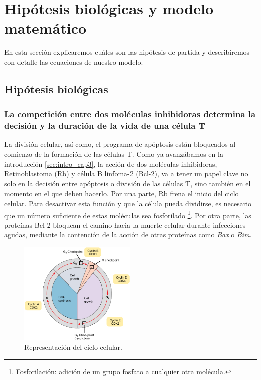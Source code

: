 \section{Hipótesis biológicas y modelo matemático}

En esta sección explicaremos cuáles son las hipótesis de partida y describiremos con detalle las ecuaciones de nuestro modelo. 

\subsection{Hipótesis biológicas} 
\label{subsec:hip_bio}

\subsubsection{La competición entre dos moléculas inhibidoras determina la decisión y la duración de la vida de una célula T}
\label{susubsec:hip_1}
	 
La división celular, así como, el programa de apóptosis están bloqueados al comienzo de la formación de las células T. Como ya avanzábamos en la introducción \ref{sec:intro_cap3}, la acción de dos moléculas inhibidoras, Retinoblastoma (Rb) y célula B linfoma-2 (Bcl-2), va a tener un papel clave no solo en la decisión entre apóptosis o división de las células T, sino también en el momento en el que deben hacerlo. Por una parte, Rb frena el inicio del ciclo celular. Para desactivar esta función y que la célula pueda dividirse, es necesario que un número suficiente de estas moléculas sea fosforilado \footnote{Fosforilación: adición de un grupo fosfato a cualquier otra molécula.}.  Por otra parte, las proteínas Bcl-2 bloquean el camino hacia la muerte celular durante infecciones agudas, mediante la contención de la acción de otras proteínas como \textit{Bax} o \textit{Bim}.


\begin{figure}[t]
	\centering
	\includegraphics[width=0.5\textwidth]{Cell_Cycle}
	\caption{Representación del ciclo celular.}
	\label{fig:ciclo celular}
\end{figure}

